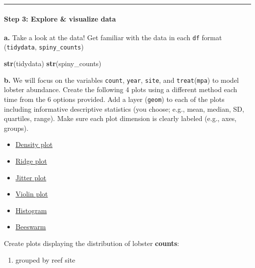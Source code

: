 \documentclass[
]{article}
\newenvironment{Shaded}{\begin{snugshade}}{\end{snugshade}}
\newcommand{\FunctionTok}[1]{\textcolor[rgb]{0.13,0.29,0.53}{\textbf{#1}}}
\newcommand{\NormalTok}[1]{#1}
\providecommand{\tightlist}{%
  \setlength{\itemsep}{0pt}\setlength{\parskip}{0pt}}
\begin{document}
\begin{center}\rule{0.5\linewidth}{0.5pt}\end{center}

\paragraph{Step 3: Explore \& visualize
data}\label{step-3-explore-visualize-data}

\textbf{a.} Take a look at the data! Get familiar with the data in each
\texttt{df} format (\texttt{tidydata}, \texttt{spiny\_counts})

\begin{Shaded}
\begin{Highlighting}[]
\FunctionTok{str}\NormalTok{(tidydata)}
\FunctionTok{str}\NormalTok{(spiny\_counts)}
\end{Highlighting}
\end{Shaded}

\textbf{b.} We will focus on the variables \texttt{count},
\texttt{year}, \texttt{site}, and \texttt{treat}(\texttt{mpa}) to model
lobster abundance. Create the following 4 plots using a different method
each time from the 6 options provided. Add a layer (\texttt{geom}) to
each of the plots including informative descriptive statistics (you
choose; e.g., mean, median, SD, quartiles, range). Make sure each plot
dimension is clearly labeled (e.g., axes, groups).

\begin{itemize}
\tightlist
\item
  \href{https://r-charts.com/distribution/density-plot-group-ggplot2}{Density
  plot}
\item
  \href{https://r-charts.com/distribution/ggridges/}{Ridge plot}
\item
  \href{https://ggplot2.tidyverse.org/reference/geom_jitter.html}{Jitter
  plot}
\item
  \href{https://r-charts.com/distribution/violin-plot-group-ggplot2}{Violin
  plot}
\item
  \href{https://r-charts.com/distribution/histogram-density-ggplot2/}{Histogram}
\item
  \href{https://r-charts.com/distribution/beeswarm/}{Beeswarm}
\end{itemize}

Create plots displaying the distribution of lobster \textbf{counts}:

\begin{enumerate}
\def\labelenumi{\arabic{enumi})}
\tightlist
\item
  grouped by reef site\\
\end{enumerate}
\end{document}
